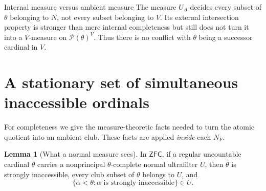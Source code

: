 \documentclass[11pt,letterpaper]{article}
\theoremstyle{definition}
\newtheorem{lemma}[definition]{Lemma}
\numberwithin{equation}{section}
\newcommand{\ZFC}{\mathsf{ZFC}}
\newcommand{\Pow}{\mathcal P}
\begin{document}
\begin{assessment}{Internal measure versus ambient measure}
The measure $U_A$ decides every subset of $\theta$ belonging to $N$, not every subset belonging to $V$. Its external intersection property is stronger than mere internal completeness but still does not turn it into a $V$-measure on $\Pow(\theta)^V$. Thus there is no conflict with $\theta$ being a successor cardinal in $V$.
\end{assessment}

\section{A stationary set of simultaneous inaccessible ordinals}\label{sec:club}

For completeness we give the measure-theoretic facts needed to turn the atomic quotient into an ambient club. These facts are applied \emph{inside} each $N_F$.

\begin{lemma}[What a normal measure sees]\label{lem:inaccmeasure}
In $\ZFC$, if a regular uncountable cardinal $\theta$ carries a nonprincipal $\theta$-complete normal ultrafilter $U$, then $\theta$ is strongly inaccessible, every club subset of $\theta$ belongs to $U$, and
\[
\{\alpha<\theta:\alpha\text{ is strongly inaccessible}\}\in U.
\]
\end{lemma}
\end{document}
